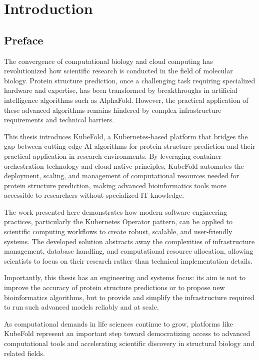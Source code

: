 

\chapter{Introduction}

\section{Preface}

The convergence of computational biology and cloud computing has revolutionized how scientific research is conducted in the field of molecular biology. Protein structure prediction, once a challenging task requiring specialized hardware and expertise, has been transformed by breakthroughs in artificial intelligence algorithms such as AlphaFold. However, the practical application of these advanced algorithms remains hindered by complex infrastructure requirements and technical barriers.

This thesis introduces KubeFold, a Kubernetes-based platform that bridges the gap between cutting-edge AI algorithms for protein structure prediction and their practical application in research environments. By leveraging container orchestration technology and cloud-native principles, KubeFold automates the deployment, scaling, and management of computational resources needed for protein structure prediction, making advanced bioinformatics tools more accessible to researchers without specialized IT knowledge.

The work presented here demonstrates how modern software engineering practices, particularly the Kubernetes Operator pattern, can be applied to scientific computing workflows to create robust, scalable, and user-friendly systems. The developed solution abstracts away the complexities of infrastructure management, database handling, and computational resource allocation, allowing scientists to focus on their research rather than technical implementation details.

Importantly, this thesis has an engineering and systems focus: its aim is not to improve the accuracy of protein structure predictions or to propose new bioinformatics algorithms, but to provide and simplify the infrastructure required to run such advanced models reliably and at scale.

As computational demands in life sciences continue to grow, platforms like KubeFold represent an important step toward democratizing access to advanced computational tools and accelerating scientific discovery in structural biology and related fields.


